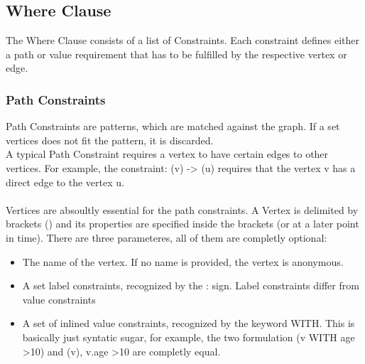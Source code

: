 \documentclass[11pt,singlecolumn]{scrartcl}
\begin{document}
\subsection{Where Clause}
The Where Clause consists of a list of Constraints. Each constraint defines either a path or value requirement that has to be fulfilled by the respective vertex or edge.
 
 \subsubsection{Path Constraints}
 Path Constraints are patterns, which are matched against the graph. If a set vertices does not fit the pattern, it is discarded.\\
 A typical Path Constraint requires a vertex to have certain edges to other vertices. For example, the constraint: (v) -> (u) requires that the vertex v has a direct edge to the vertex u.\\\\Vertices are absoultly essential for the path constraints. A Vertex is delimited by brackets () and its properties are specified inside the brackets (or at a later point in time). There are three parameteres, all of them are completly optional:\\
 \begin{itemize}
 \item The name of the vertex. If no name is provided, the vertex is anonymous.
 \item A set label constraints, recognized by the : sign. Label constraints differ from value constraints
 \item A set of inlined value constraints, recognized by the keyword WITH. This is basically just syntatic sugar, for example, the two formulation (v WITH age \textgreater 10) and (v), v.age \textgreater 10 are completly equal.
 \end{itemize}
 
\end{document}
